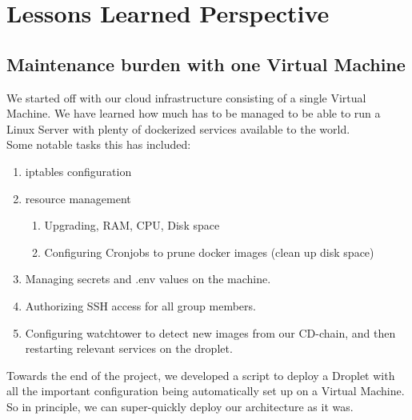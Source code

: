\section{Lessons Learned Perspective}

\subsection{Maintenance burden with one Virtual Machine}
We started off with our cloud infrastructure consisting of a single Virtual Machine. We have learned how much has to be managed to be able to run a Linux Server with plenty of dockerized services available to the world. \\
Some notable tasks this has included:
\begin{enumerate}
    \item iptables configuration
    \item resource management 
    \begin{enumerate}
        \item Upgrading, RAM, CPU, Disk space
        \item Configuring Cronjobs to prune docker images (clean up disk space)
    \end{enumerate}
    \item Managing secrets and .env values on the machine. 
    \item Authorizing SSH access for all group members.
    \item Configuring watchtower to detect new images from our CD-chain, and then restarting relevant services on the droplet.
\end{enumerate}
Towards the end of the project, we developed a script to deploy a Droplet with all the important configuration being automatically set up on a Virtual Machine. So in principle, we can super-quickly deploy our architecture as it was.

